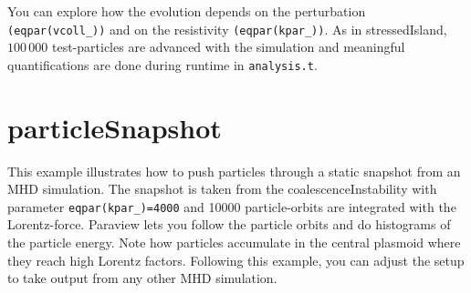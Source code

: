 \documentclass[10pt]{article}
\begin{document}
You can explore how the evolution depends on the perturbation {\tt (eqpar(vcoll\_))} and on the resistivity {\tt (eqpar(kpar\_))}.  
As in stressedIsland, $100\,000$ test-particles are advanced with the simulation and meaningful quantifications are done during runtime in {\tt analysis.t}.  

\section*{particleSnapshot}

This example illustrates how to push particles through a static snapshot from an MHD simulation.  The snapshot is taken from the coalescenceInstability with parameter {\tt eqpar(kpar\_)=4000} and 10000 particle-orbits are integrated with the Lorentz-force.  
Paraview lets you follow the particle orbits and do histograms of the particle energy.  Note how particles accumulate in the central plasmoid where they reach high Lorentz factors.  
Following this example, you can adjust the setup to take output from any other MHD simulation.  
\end{document}
